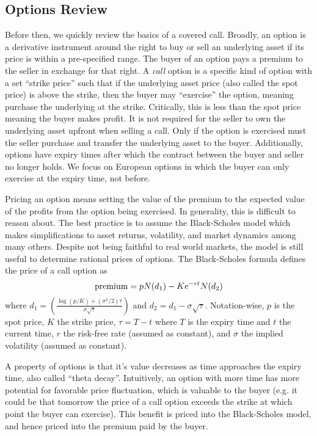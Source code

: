 \documentclass[hidelinks, 12pt]{article}
\begin{document}
\subsection{Options Review}

Before then, we quickly review the basics of a covered call. Broadly, an option is a derivative instrument around the right to buy or sell an underlying asset if its price is within a pre-specified range. The buyer of an option pays a premium to the seller in exchange for that right. A \textit{call} option is a specific kind of option with a set ``strike price'' such that if the underlying asset price (also called the spot price) is above the strike, then the buyer may ``exercise'' the option, meaning purchase the underlying at the strike. Critically, this is less than the spot price meaning the buyer makes profit. It is not required for the seller to own the underlying asset upfront when selling a call. Only if the option is exercised must the seller purchase and transfer the underlying asset to the buyer. Additionally, options have expiry times after which the contract between the buyer and seller no longer holds. We focus on European options in which the buyer can only exercise at the expiry time, not before.

Pricing an option means setting the value of the premium to the expected value of the profits from the option being exercised. In generality, this is difficult to  reason about. The best practice is to assume the  Black-Scholes model which makes simplifications to asset returns, volatility, and market dynamics among many others. Despite not being faithful to real world markets, the model is still useful to determine rational prices of options. The Black-Scholes formula defines the price of a call option as
\[\textup{premium} = p N(d_1) - K e^{-rt} N(d_2)\]
where $d_1 = \left( \frac{\log(p/K) + (\sigma^2/2)\tau}{\sigma\sqrt{\tau}}\right)$ and $d_2 = d_1 - \sigma\sqrt{\tau}$. Notation-wise, $p$ is the spot price, $K$  the strike price, $\tau = T-t$ where $T$ is the expiry time and $t$ the current time, $r$ the risk-free rate (assumed as constant), and $\sigma$ the implied volatility (assumed as constant).

A property of options is that it's value decreases as time approaches the expiry time, also called ``theta decay''. Intuitively, an option with more time has more potential for favorable price fluctuation, which is valuable to the buyer (e.g. it could be that tomorrow the price of a call option exceeds the strike at which point the buyer can exercise). This benefit is priced into the Black-Scholes model, and hence priced into the premium paid by the buyer.
\end{document}
